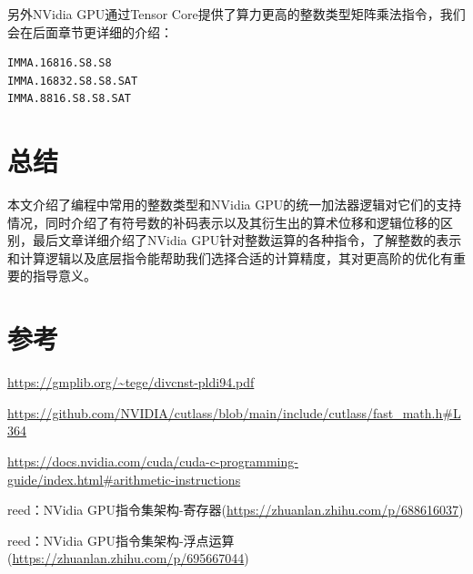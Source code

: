 另外NVidia GPU通过Tensor Core提供了算力更高的整数类型矩阵乘法指令，我们会在后面章节更详细的介绍：

\begin{lstlisting}
IMMA.16816.S8.S8
IMMA.16832.S8.S8.SAT
IMMA.8816.S8.S8.SAT
\end{lstlisting}

\section{总结}

本文介绍了编程中常用的整数类型和NVidia GPU的统一加法器逻辑对它们的支持情况，同时介绍了有符号数的补码表示以及其衍生出的算术位移和逻辑位移的区别，最后文章详细介绍了NVidia GPU针对整数运算的各种指令，了解整数的表示和计算逻辑以及底层指令能帮助我们选择合适的计算精度，其对更高阶的优化有重要的指导意义。

\section{参考}

\url{https://gmplib.org/~tege/divcnst-pldi94.pdf}

\url{https://github.com/NVIDIA/cutlass/blob/main/include/cutlass/fast_math.h#L364}

\url{https://docs.nvidia.com/cuda/cuda-c-programming-guide/index.html#arithmetic-instructions}

reed：NVidia GPU指令集架构-寄存器(\url{https://zhuanlan.zhihu.com/p/688616037})

reed：NVidia GPU指令集架构-浮点运算(\url{https://zhuanlan.zhihu.com/p/695667044})

